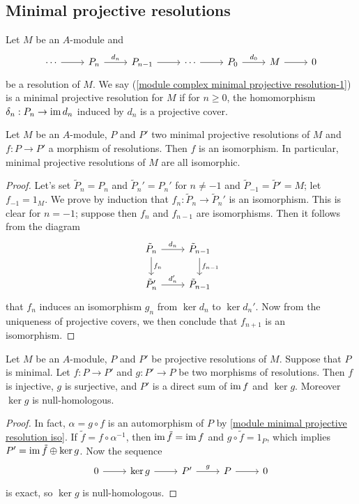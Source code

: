 \subsection{Minimal projective resolutions}
Let $M$ be an $A$-module and 
\begin{equation}\label{module complex minimal projective resolution-1}
\begin{tikzcd}
\cdots\ar[r]&P_n\ar[r,"d_n"]&P_{n-1}\ar[r]&\cdots\ar[r]&P_0\ar[r,"d_0"]&M\ar[r]&0
\end{tikzcd}
\end{equation}
be a resolution of $M$. We say (\ref{module complex minimal projective resolution-1}) is a minimal projective resolution for $M$ if for $n\geq 0$, the homomorphism $\delta_n:P_n\to\operatorname{im} d_n$ induced by $d_n$ is a projective cover.
\begin{proposition}\label{module minimal projective resolution iso}
Let $M$ be an $A$-module, $P$ and $P'$ two minimal projective resolutions of $M$ and $f:P\to P'$ a morphism of resolutions. Then $f$ is an isomorphism. In particular, minimal projective resolutions of $M$ are all isomorphic.
\end{proposition}
\begin{proof}
Let's set $\tilde{P}_n=P_n$ and $\tilde{P}_n'=P_n'$ for $n\neq -1$ and $\tilde{P}_{-1}=\tilde{P}'=M$; let $f_{-1}=1_M$. We prove by induction that $f_n:\tilde{P}_n\to\tilde{P}_n'$ is an isomorphism. This is clear for $n=-1$; suppose then $f_n$ and $f_{n-1}$ are isomorphisms. Then it follows from the diagram
\[\begin{tikzcd}
\tilde{P}_n\ar[r,"d_n"]\ar[d,"f_n"]&\tilde{P}_{n-1}\ar[d,"f_{n-1}"]\\
\tilde{P}_n'\ar[r,"d_n'"]&\tilde{P}_{n-1}
\end{tikzcd}\]
that $f_n$ induces an isomorphism $g_n$ from $\ker d_n$ to $\ker d_n'$. Now from the uniqueness of projective covers, we then conclude that $f_{n+1}$ is an isomorphism.
\end{proof}
\begin{corollary}\label{module minimal projective resolution morphism out and in}
Let $M$ be an $A$-module, $P$ and $P'$ be projective resolutions of $M$. Suppose that $P$ is minimal. Let $f:P\to P'$ and $g:P'\to P$ be two morphisms of resolutions. Then $f$ is injective, $g$ is surjective, and $P'$ is a direct sum of $\operatorname{im} f$ and $\ker g$. Moreover $\ker g$ is null-homologous.
\end{corollary}
\begin{proof}
In fact, $\alpha=g\circ f$ is an automorphism of $P$ by \cref{module minimal projective resolution iso}. If $\tilde{f}=f\circ\alpha^{-1}$, then $\operatorname{im}\tilde{f}=\operatorname{im} f$ and $g\circ\tilde{f}=1_P$, which implies $P'=\operatorname{im}\tilde{f}\oplus\operatorname{ker} g$. Now the sequence
\[\begin{tikzcd}
0\ar[r]&\ker g\ar[r]&P'\ar[r,"g"]&P\ar[r]&0
\end{tikzcd}\]
is exact, so $\ker g$ is null-homologous.
\end{proof}
